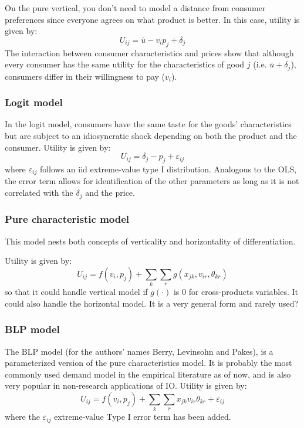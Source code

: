 On the pure vertical, you don't need to model a distance from consumer preferences since everyone agrees on what product is better. In this case, utility is given by: $$ U_{ij} = \bar u - v_ip_j + \delta_j $$ The interaction between consumer characteristics and prices show that although every consumer has the same utility for the characteristics of good $j$ (i.e. $\bar u + \delta_j$), consumers differ in their willingness to pay ($v_i$).

\subsubsection{Logit model}

In the logit model, consumers have the same taste for the goods' characteristics but are subject to an idiosyncratic shock depending on both the product and the consumer. Utility is given by: $$U_{ij} = \delta_j - p_j + \varepsilon_{ij} $$ where $\varepsilon_{ij}$ follows an iid extreme-value type I distribution. Analogous to the OLS, the error term allows for identification of the other parameters as long as it is not correlated with the $\delta_j$ and the price.

\subsubsection{Pure characteristic model}

This model nests both concepts of verticality and horizontality of differentiation.

Utility is given by: $$ U_{ij} = f(v_i, p_j) + \sum_{k}\sum_{r} g(x_{jk}, v_{ir}, \theta_{kr}) $$ so that it could handle vertical model if $g(\cdot)$ is 0 for cross-products variables. It could also handle the horizontal model. It is a very general form and rarely used?

\subsubsection{BLP model}

The BLP model (for the authors' names Berry, Levinsohn and Pakes), is a parameterized version of the pure characteristics model. It is probably the most commonly used demand model in the empirical literature as of now, and is also very popular in non-research applications of IO. Utility is given by: $$ U_{ij} = f(v_i, p_j) + \sum_{k}\sum_{r} x_{jk}v_{ir}\theta_{kr} + \varepsilon_{ij} $$ where the $\varepsilon_{ij}$ extreme-value Type I error term has been added.

